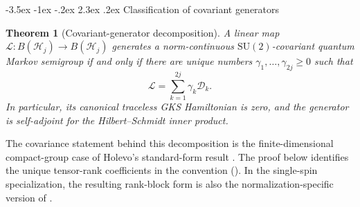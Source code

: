 \documentclass[twoside,10pt]{article}
\makeatletter
\numberwithin{equation}{section}
\theoremstyle{slbody}
\newtheorem{theorem}{Theorem}[section]
\theoremstyle{definition}
\theoremstyle{remark}
\newcommand{\SU}{\mathrm{SU}(2)}
\newcommand{\cL}{\mathcal L}
\newcommand{\cD}{\mathcal D}
\renewcommand{\section}{%
  \@startsection{section}{1}{\z@}%
    {-3.5ex \@plus -1ex \@minus -.2ex}%
    {2.3ex \@plus .2ex}%
    {\normalfont\large\bfseries}}
\renewcommand{\eqref}[1]{%
  \textup{{\normalfont(\oldstylenums{\ref{#1}}}\normalfont)}}
\makeatother
\begin{document}
\section{Classification of covariant generators}

\begin{theorem}[Covariant-generator decomposition]
\label{thm:generator-classification}
A linear map \(\cL:B(\mathcal H_j)\to B(\mathcal H_j)\) generates a
norm-continuous \(\SU\)-covariant quantum Markov semigroup if and only if
there are unique numbers \(\gamma_1,\ldots,\gamma_{2j}\geq0\) such that
\begin{equation}\label{eq:generator-cone}
 \cL=\sum_{k=1}^{2j}\gamma_k\cD_k.
\end{equation}
In particular, its canonical traceless GKS Hamiltonian is zero, and the
generator is self-adjoint for the Hilbert--Schmidt inner product.
\end{theorem}

The covariance statement behind this decomposition is the
finite-dimensional compact-group case of Holevo's standard-form result
\cite[Sec.~3.3.4, Theorem~3.3.5]{Holevo2001}.  The proof below identifies the unique
tensor-rank coefficients in the convention
\eqref{eq:tensor-orthogonality}.  In the single-spin specialization,
the resulting rank-block form is also the normalization-specific
version of \cite[Eqs.~(2.8) and (2.11)]{GoriniVerriSudarshan1980}.
\end{document}

